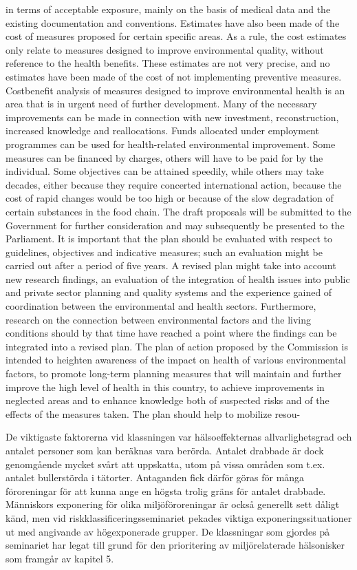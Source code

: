 in terms of acceptable exposure, mainly on the basis of medical data and the existing documentation and conventions.
Estimates have also been made of the cost of measures proposed for certain specific areas. As a rule, the cost estimates only relate to measures designed to improve environmental quality, without reference to the health benefits. These estimates are not very precise, and no estimates have been made of the cost of not implementing preventive measures. Costbenefit analysis of measures designed to improve environmental health is an area that is in urgent need of further development.
Many of the necessary improvements can be made in connection with new investment, reconstruction, increased knowledge and reallocations. Funds allocated under employment programmes can be used for health-related environmental improvement. Some measures can be financed by charges, others will have to be paid for by the individual. Some objectives can be attained speedily, while others may take decades, either because they require concerted international action, because the cost of rapid changes would be too high or because of the slow degradation of certain substances in the food chain.
The draft proposals will be submitted to the Government for further consideration and may subsequently be presented to the Parliament. It is important that the plan should be evaluated with respect to guidelines, objectives and indicative measures; such an evaluation might be carried out after a period of five years. A revised plan might take into account new research findings, an evaluation of the integration of health issues into public and private sector planning and quality systems and the experience gained of coordination between the environmental and health sectors. Furthermore, research on the connection between environmental factors and the living conditions should by that time have reached a point where the findings can be integrated into a revised plan.
The plan of action proposed by the Commission is intended to heighten awareness of the impact on health of various environmental factors, to promote long-term planning measures that will maintain and further improve the high level of health in this country, to achieve improvements in neglected areas and to enhance knowledge both of suspected risks and of the effects of the measures taken. The plan should help to mobilize resou-

De viktigaste faktorerna vid klassningen var hälsoeffekternas allvarlighetsgrad och antalet personer som kan beräknas vara berörda. Antalet drabbade är dock genomgående mycket svårt att uppskatta, utom på vissa områden som t.ex. antalet bullerstörda i tätorter. Antaganden fick därför göras för många föroreningar för att kunna ange en högsta trolig gräns för antalet drabbade.
Människors exponering för olika miljöföroreningar är också generellt sett dåligt känd, men vid riskklassificeringsseminariet pekades viktiga exponeringssituationer ut med angivande av högexponerade grupper. De klassningar som gjordes på seminariet har legat till grund för den prioritering av miljörelaterade hälsonisker som framgår av kapitel 5.
